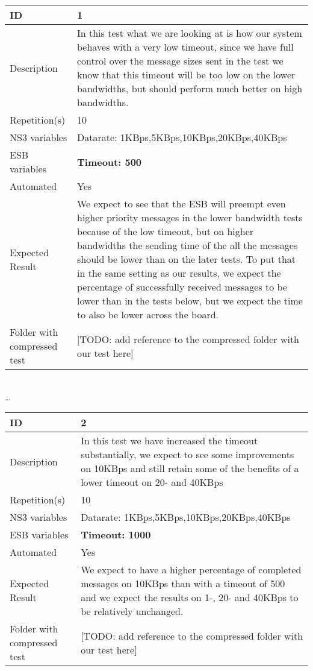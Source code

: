 \begin{center}

\begin{tabular}{| p{4cm} | p{8cm} |}%
	\hline
	ID & 1 \\
	\hline
	Description &  In this test what we are looking at is how our system behaves with a very low timeout, since we have full control over the message sizes sent in the test we know that this timeout will be too low on the lower bandwidths, but should perform much better on high bandwidths. \\
	\hline
	Repetition(s) & 10 \\
	\hline
	NS3 variables & Datarate: 1KBps,5KBps,10KBps,20KBps,40KBps \\
	\hline
	ESB variables & \textbf{Timeout: 500} \\
	\hline
	Automated & Yes \\
	\hline
	Expected Result & We expect to see that the ESB will preempt even higher priority messages in the lower bandwidth tests because of the low timeout, but on higher bandwidths the sending time of the all the messages should be lower than on the later tests. To put that in the same setting as our results, we expect the percentage of successfully received messages to be lower than in the tests below, but we expect the time to also be lower across the board.  \\
	\hline
	Folder with compressed test & [TODO: add reference to the compressed folder with our test here]\\
	\hline
\end{tabular}

\\ \ldots \\

\begin{tabular}{| p{4cm} | p{8cm} |}%
	\hline
	ID & 2 \\
	\hline
	Description & In this test we have increased the timeout substantially, we expect to see some improvements on 10KBps and still retain some of the benefits of a lower timeout on 20- and 40KBps \\
	\hline
	Repetition(s) & 10 \\
	\hline
	NS3 variables & Datarate: 1KBps,5KBps,10KBps,20KBps,40KBps \\
	\hline
	ESB variables & \textbf{Timeout: 1000} \\
	\hline
	Automated & Yes \\
	\hline
	Expected Result & We expect to have a higher percentage of completed messages on 10KBps than with a timeout of 500 and we expect the results on 1-, 20- and 40KBps to be relatively unchanged. \\
	\hline
	Folder with compressed test & [TODO: add reference to the compressed folder with our test here]\\
	\hline
\end{tabular}


\end{center}
